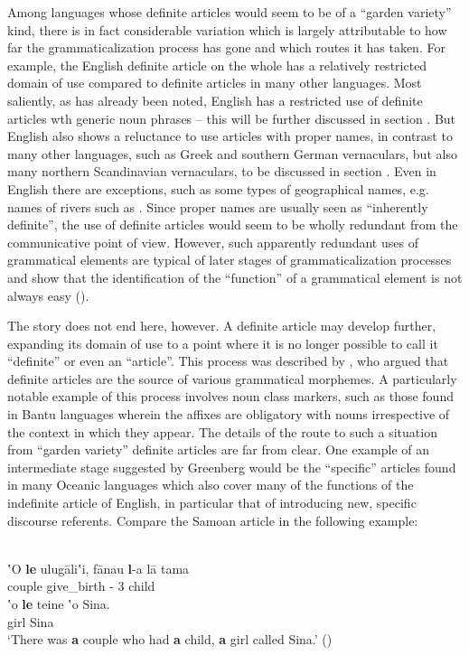 Among languages whose definite articles would seem to be of a “garden variety” kind, there is in fact considerable variation which is largely attributable to how far the grammaticalization process has gone and which routes it has taken. For example, the English definite article on the whole has a relatively restricted domain of use compared to definite articles in many other languages. Most saliently, as has already been noted, English has a restricted use of definite articles wth generic noun phrases – this will be further discussed in section . But English also shows a reluctance to use articles with proper names, in contrast to many other languages, such as Greek and southern German vernaculars, but also many northern Scandinavian vernaculars, to be discussed in section . Even in English there are exceptions, such as some types of geographical names, e.g. names of rivers such as . Since proper names are usually seen as “inherently definite”, the use of definite articles would seem to be wholly redundant from the communicative point of view. However, such apparently redundant uses of grammatical elements are typical of later stages of grammaticalization processes and show that the identification of the “function” of a grammatical element is not always easy (\citet[81-86]{Dahl2004}).

The story does not end here, however. A definite article may develop further, expanding its domain of use to a point where it is no longer possible to call it “definite” or even an “article”. This process was described by \citet{Greenberg1978}, who argued that definite articles are the source of various grammatical morphemes.  A particularly notable example of this process involves noun class markers, such  as those found in Bantu languages wherein the affixes are obligatory with nouns irrespective of the context in which they appear. The details of the route to such a situation from “garden variety” definite articles are far from clear. One example of an intermediate stage suggested by Greenberg would be the “specific” articles found in many Oceanic languages which also cover many of the functions of the indefinite article of English, in particular that of introducing new, specific discourse referents. Compare the Samoan article  in the following example: 

\ea\label{}
\\
\gll	ʽO  \textbf{le} ulug\=aliʽi,  f\=anau  \textbf{l}{}-a  l\=a  tama\\
		{\prs}  \textbf{{\art}} couple  give\_birth  \textbf{{\art}}{}-{\poss}  3{\du}  child\\
\gll	ʽo  \textbf{le} teine  ʽo  Sina.\\
		{\prs}  \textbf{{\art}} girl  {\prs}  Sina\\
\glt ‘There was \textbf{a} couple who had \textbf{a} child, \textbf{a} girl called Sina.’ (\citet[259]{HovdhaugenEtAl1992})


